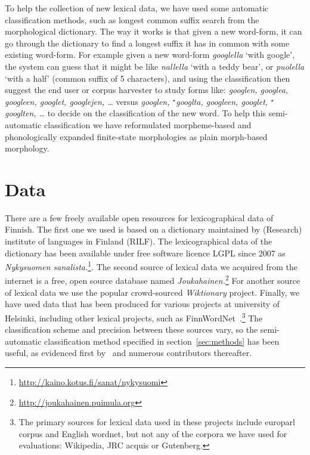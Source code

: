 \documentclass[a4paper,12pt]{article}
\begin{document}
To help the collection of new lexical data, we have used some automatic
classification methods, such as longest common suffix search from the
morphological dictionary.  The way it works is that given a new word-form, it
can go through the dictionary to find a longest suffix it has in common with
some existing word-form. For example  given a new word-form \emph{googlella}
`with google', the system can guess that it might be like \emph{nallella} `with
a teddy bear', or \emph{puolella} `with a half' (common suffix of 5
characters), and using the classification then suggest the end user or corpus
harvester to study forms like: \emph{googlen, googlea, googleen, googlet,
googlejen, \ldots} versus \emph{googlen, ${}^\star$googlta, googleen, googlet,
${}^\star$googlten, \ldots} to decide on the classification of the new word. To
help this semi-automatic classification we have reformulated morpheme-based and
phonologically expanded finite-state morphologies as plain morph-based
morphology.

\section{Data}
\label{sec:data}

There are a few freely available open resources for lexicographical data of
Finnish. The first one  we used is based on a dictionary maintained by (Research)
institute of languages in Finland (RILF). The lexicographical data of the
dictionary has been available under free software licence LGPL since 2007 as
\emph{Nykysuomen
sanalista.}\footnote{\url{http://kaino.kotus.fi/sanat/nykysuomi}}.  The second
source of lexical data we acquired from the internet is a free, open source
database named
\emph{Joukahainen.}\footnote{\url{http://joukahainen.puimula.org}}  For another
source of lexical data we use the popular crowd-sourced \emph{Wiktionary}
project.  Finally, we have used data that has been produced for various
projects at university of Helsinki, including other lexical projects, such as
FinnWordNet~\citep{linden2010finnwordnet}.\footnote{The primary sources for
lexical data used in these projects include europarl corpus and English
wordnet, but not any of the corpora we have used for evaluations: Wikipedia,
JRC acquis or Gutenberg.} The classification scheme and precision between
these sources vary, so the semi-automatic classification method specified in
section~\ref{sec:methods} has been useful, as evidenced first
by~\citet{listenmaa2009combining} and numerous contributors thereafter.
\end{document}
